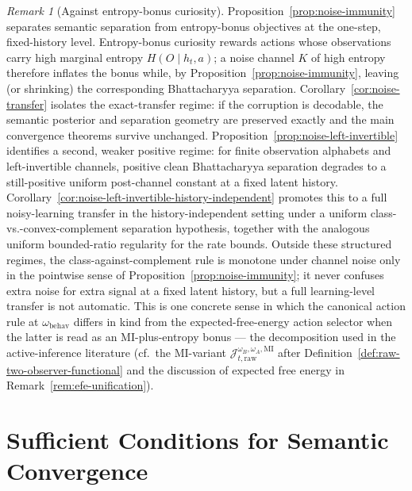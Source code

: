 \documentclass[11pt]{article}
\theoremstyle{definition}
\theoremstyle{remark}
\newtheorem{remark}[theorem]{Remark}
\begin{document}
\begin{remark}[Against entropy-bonus curiosity]
\label{rem:against-entropy-bonus}
Proposition~\ref{prop:noise-immunity} separates semantic separation from entropy-bonus objectives at the one-step, fixed-history level. Entropy-bonus curiosity rewards actions whose observations carry high marginal entropy $H(O\mid h_t,a)$; a noise channel $K$ of high entropy therefore inflates the bonus while, by Proposition~\ref{prop:noise-immunity}, leaving (or shrinking) the corresponding Bhattacharyya separation. Corollary~\ref{cor:noise-transfer} isolates the exact-transfer regime: if the corruption is decodable, the semantic posterior and separation geometry are preserved exactly and the main convergence theorems survive unchanged. Proposition~\ref{prop:noise-left-invertible} identifies a second, weaker positive regime: for finite observation alphabets and left-invertible channels, positive clean Bhattacharyya separation degrades to a still-positive uniform post-channel constant at a fixed latent history. Corollary~\ref{cor:noise-left-invertible-history-independent} promotes this to a full noisy-learning transfer in the history-independent setting under a uniform class-vs.-convex-complement separation hypothesis, together with the analogous uniform bounded-ratio regularity for the rate bounds. Outside these structured regimes, the class-against-complement rule is monotone under channel noise only in the pointwise sense of Proposition~\ref{prop:noise-immunity}; it never confuses extra noise for extra signal at a fixed latent history, but a full learning-level transfer is not automatic. This is one concrete sense in which the canonical action rule at $\omega_{\mathrm{behav}}$ differs in kind from the expected-free-energy action selector when the latter is read as an MI-plus-entropy bonus --- the decomposition used in the active-inference literature (cf.\ the MI-variant $\mathcal J_{t,\mathrm{raw}}^{\omega_B,\omega_A,\mathrm{MI}}$ after Definition~\ref{def:raw-two-observer-functional} and the discussion of expected free energy in Remark~\ref{rem:efe-unification}).
\end{remark}

\section{Sufficient Conditions for Semantic Convergence}
\label{sec:main}
\end{document}
